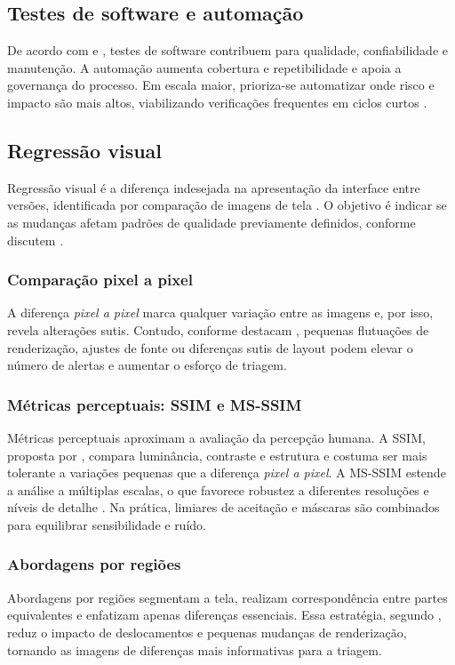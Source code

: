 \documentclass{UNESC}
\begin{document}
\subsection{Testes de software e automação}

De acordo com  e , testes de software contribuem para qualidade, confiabilidade e manutenção. A automação aumenta cobertura e repetibilidade e apoia a governança do processo. Em escala maior, prioriza-se automatizar onde risco e impacto são mais altos, viabilizando verificações frequentes em ciclos curtos \cite{costa2022}.

\subsection{Regressão visual}

Regressão visual é a diferença indesejada na apresentação da interface entre versões, identificada por comparação de imagens de tela \cite{tanno2020,figueiredo2018,bordignon2019,tanoue2018vrt}. O objetivo é indicar se as mudanças afetam padrões de qualidade previamente definidos, conforme discutem .

\subsubsection{Comparação pixel a pixel}
A diferença \emph{pixel a pixel} marca qualquer variação entre as imagens e, por isso, revela alterações sutis. Contudo, conforme destacam , pequenas flutuações de renderização, ajustes de fonte ou diferenças sutis de layout podem elevar o número de alertas e aumentar o esforço de triagem.

\subsubsection{Métricas perceptuais: SSIM e MS-SSIM}
Métricas perceptuais aproximam a avaliação da percepção humana. A SSIM, proposta por , compara luminância, contraste e estrutura e costuma ser mais tolerante a variações pequenas que a diferença \emph{pixel a pixel}. A MS-SSIM estende a análise a múltiplas escalas, o que favorece robustez a diferentes resoluções e níveis de detalhe \cite{wang2003msssim}. Na prática, limiares de aceitação e máscaras são combinados para equilibrar sensibilidade e ruído.

\subsubsection{Abordagens por regiões}
Abordagens por regiões segmentam a tela, realizam correspondência entre partes equivalentes e enfatizam apenas diferenças essenciais. Essa estratégia, segundo , reduz o impacto de deslocamentos e pequenas mudanças de renderização, tornando as imagens de diferenças mais informativas para a triagem.
\end{document}
